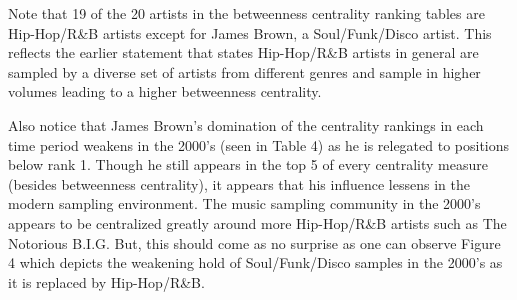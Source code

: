 \documentclass[pageno]{jpaper}
\begin{document}
\begin{table}[H]
\caption{Top Artist Centralities (2000's)}
\label{table:table4}
\end{table}
Note that 19 of the 20 artists in the betweenness centrality ranking tables are Hip-Hop/R\&B artists except for James Brown, a Soul/Funk/Disco artist. This reflects the earlier statement that states Hip-Hop/R\&B artists in general are sampled by a diverse set of artists from different genres and sample in higher volumes leading to a higher betweenness centrality.

Also notice that James Brown's domination of the centrality rankings in each time period weakens in the 2000's (seen in Table 4) as he is relegated to positions below rank 1. Though he still appears in the top 5 of every centrality measure (besides betweenness centrality), it appears that his influence lessens in the modern sampling environment. The music sampling community in the 2000's appears to be centralized greatly around more Hip-Hop/R\&B artists such as The Notorious B.I.G. But, this should come as no surprise as one can observe Figure 4 which depicts the weakening hold of Soul/Funk/Disco samples in the 2000's as it is replaced by Hip-Hop/R\&B.
\end{document}
